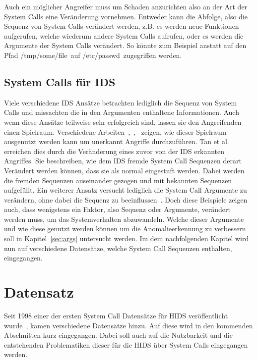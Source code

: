         Auch ein möglicher Angreifer muss um Schaden anzurichten also an der Art der System Calls eine Veränderung vornehmen.
        Entweder kann die Abfolge, also die Sequenz von System Calls verändert werden, z.B. es werden neue Funktionen aufgerufen, welche wiederum andere System Calls aufrufen,
        oder es werden die Argumente der System Calls verändert.
        So könnte zum Beispiel anstatt auf den Pfad \glqq /tmp/some/file\grqq \ auf \glqq /etc/passwd\grqq \ zugegriffen werden. 

        \subsection{System Calls für IDS}
            Viele verschiedene IDS Ansätze betrachten lediglich die Sequenz von System Calls und missachten die in den Argumenten enthaltene Informationen.
            Auch wenn diese Ansätze teilweise sehr erfolgreich sind, lassen sie den Angreifenden einen Spielraum.
            Verschiedene Arbeiten~\cite{Syscallseqexploit1},~\cite{Syscallseqexploit2},~\cite{Syscallseqexploit3} zeigen, wie dieser Spielraum ausgenutzt werden kann um unerkannt Angriffe durchzuführen. 
            Tan et al.~\cite{Syscallseqexploit3} erreichen dies durch die Veränderung eines zuvor von der IDS erkannten Angriffes.
            Sie beschreiben, wie dem IDS fremde System Call Sequenzen derart Verändert werden können, dass sie als normal eingestuft werden.
            Dabei werden die fremden Sequenzen auseinander gezogen und mit bekannten Sequenzen aufgefüllt. 
            Ein weiterer Ansatz versucht lediglich die System Call Argumente zu verändern, ohne dabei die Sequenz zu beeinflussen~\cite{Syscallseqexploit1}.
            Doch diese Beispiele zeigen auch, dass wenigstens ein Faktor, also Sequenz oder Argumente, verändert werden muss, um das Systemverhalten abzuwandeln.
            Welche dieser Argumente und wie diese genutzt werden können um die Anomalieerkennung zu verbessern soll in Kapitel~\ref{sec:args} untersucht werden.
            Im dem nachfolgenden Kapitel wird nun auf verschiedene Datensätze, welche System Call Sequenzen enthalten, eingegangen.

    \section{Datensatz}\label{sec:Datensatz}
        Seit 1998 einer der ersten System Call Datensätze für HIDS veröffentlicht wurde~\cite{DARPA},
        kamen verschiedene Datensätze hinzu.
        Auf diese wird in den kommenden Abschnitten kurz eingegangen.
        Dabei soll auch auf die Nutzbarkeit und die entstehenden Problematiken dieser für die HIDS über System Calls eingegangen werden.
